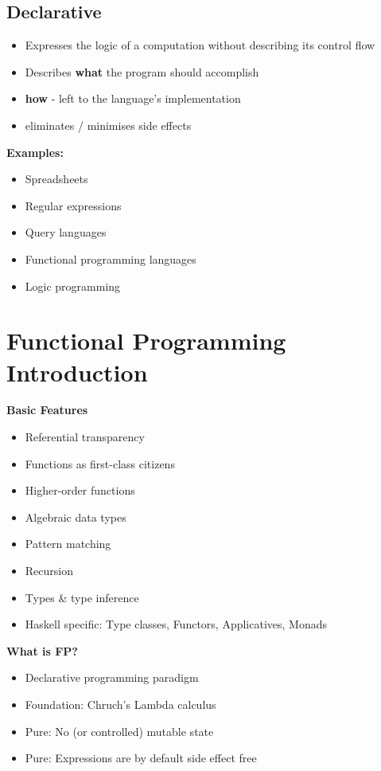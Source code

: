 \subsection{Declarative}
\begin{itemize}
    \item Expresses the logic of a computation without describing its control flow
    \item Describes \textbf{what} the program should accomplish
    \item \textbf{how} - left to the language's implementation
    \item eliminates / minimises side effects
\end{itemize}
\textbf{Examples:}
\begin{itemize}
    \item Spreadsheets
    \item Regular expressions
    \item Query languages
    \item Functional programming languages
    \item Logic programming
\end{itemize}

\section{Functional Programming Introduction}
\textbf{Basic Features}
\begin{itemize}
    \item Referential transparency
    \item Functions as first-class citizens
    \item Higher-order functions
    \item Algebraic data types
    \item Pattern matching
    \item Recursion
    \item Types \& type inference
    \item Haskell specific: Type classes, Functors, Applicatives, Monads
\end{itemize}
\textbf{What is FP?}
\begin{itemize}
    \item Declarative programming paradigm
    \item Foundation: Chruch's Lambda calculus
    \item Pure: No (or controlled) mutable state
    \item Pure: Expressions are by default side effect free
\end{itemize}

